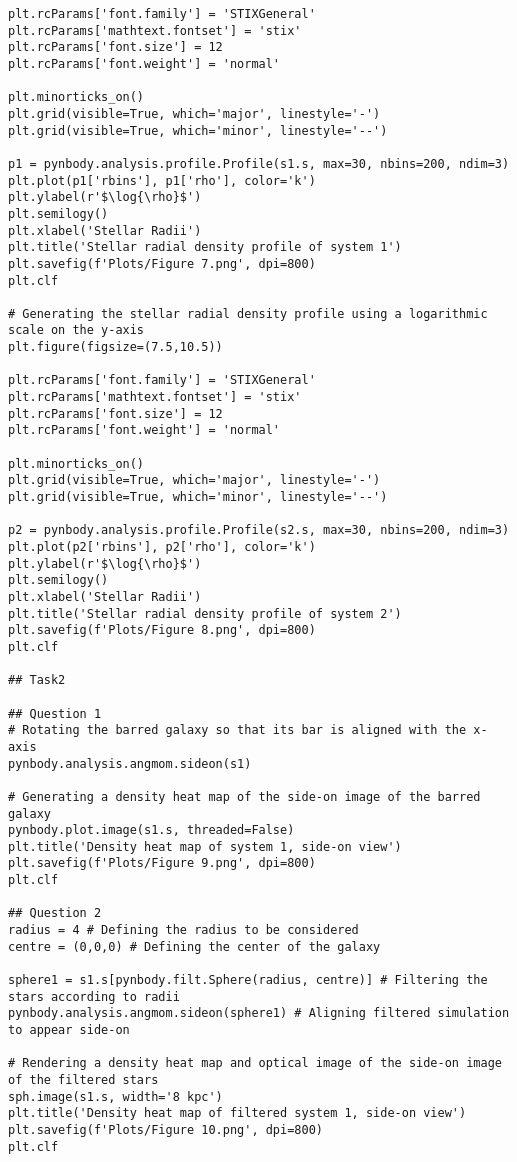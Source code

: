 \documentclass[12pt, a4paper]{article}
\begin{document}
\begin{lstlisting}[language=iPython]
plt.rcParams['font.family'] = 'STIXGeneral'
plt.rcParams['mathtext.fontset'] = 'stix'
plt.rcParams['font.size'] = 12
plt.rcParams['font.weight'] = 'normal'

plt.minorticks_on()
plt.grid(visible=True, which='major', linestyle='-')
plt.grid(visible=True, which='minor', linestyle='--')

p1 = pynbody.analysis.profile.Profile(s1.s, max=30, nbins=200, ndim=3)
plt.plot(p1['rbins'], p1['rho'], color='k')
plt.ylabel(r'$\log{\rho}$')
plt.semilogy()
plt.xlabel('Stellar Radii')
plt.title('Stellar radial density profile of system 1')
plt.savefig(f'Plots/Figure 7.png', dpi=800)
plt.clf

# Generating the stellar radial density profile using a logarithmic scale on the y-axis
plt.figure(figsize=(7.5,10.5))

plt.rcParams['font.family'] = 'STIXGeneral'
plt.rcParams['mathtext.fontset'] = 'stix'
plt.rcParams['font.size'] = 12
plt.rcParams['font.weight'] = 'normal'

plt.minorticks_on()
plt.grid(visible=True, which='major', linestyle='-')
plt.grid(visible=True, which='minor', linestyle='--')

p2 = pynbody.analysis.profile.Profile(s2.s, max=30, nbins=200, ndim=3)
plt.plot(p2['rbins'], p2['rho'], color='k')
plt.ylabel(r'$\log{\rho}$')
plt.semilogy()
plt.xlabel('Stellar Radii')
plt.title('Stellar radial density profile of system 2')
plt.savefig(f'Plots/Figure 8.png', dpi=800)
plt.clf

## Task2

## Question 1
# Rotating the barred galaxy so that its bar is aligned with the x-axis
pynbody.analysis.angmom.sideon(s1)

# Generating a density heat map of the side-on image of the barred galaxy
pynbody.plot.image(s1.s, threaded=False)
plt.title('Density heat map of system 1, side-on view')
plt.savefig(f'Plots/Figure 9.png', dpi=800)
plt.clf

## Question 2
radius = 4 # Defining the radius to be considered 
centre = (0,0,0) # Defining the center of the galaxy

sphere1 = s1.s[pynbody.filt.Sphere(radius, centre)] # Filtering the stars according to radii
pynbody.analysis.angmom.sideon(sphere1) # Aligning filtered simulation to appear side-on

# Rendering a density heat map and optical image of the side-on image of the filtered stars
sph.image(s1.s, width='8 kpc') 
plt.title('Density heat map of filtered system 1, side-on view')
plt.savefig(f'Plots/Figure 10.png', dpi=800)
plt.clf


\end{lstlisting}
\end{document}
